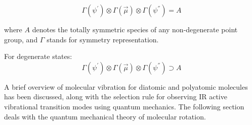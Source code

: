 \[\Gamma(\psi^{'}) \otimes \Gamma(\vec{\mu}) \otimes \Gamma(\psi^{''}) = A\]

where $A$ denotes the totally symmetric species of any non-degenerate point group, and $\Gamma$ stands for symmetry representation.

For degenerate states:
\[\Gamma(\psi^{'}) \otimes \Gamma(\vec{\mu}) \otimes \Gamma(\psi^{''}) \supset A\]

A brief overview of molecular vibration for diatomic and polyatomic molecules has been discussed, along with the selection rule for observing IR active vibrational transition modes using quantum mechanics. The following section deals with the quantum mechanical theory of molecular rotation.
